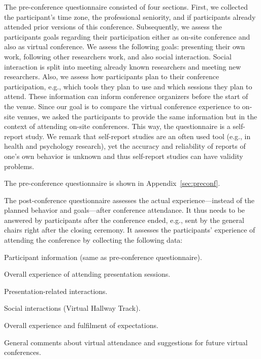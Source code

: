 \documentclass[sigconf]{acmart}
\newcommand{\afblock}[1]{\noindent{\textbf{#1 }}}
\begin{document}
The pre-conference questionnaire consisted of four sections.
First, we collected the participant's time zone, the professional seniority, and if participants already attended prior versions of this conference.
Subsequently, we assess the participants goals regarding their participation either as on-site conference and also as  virtual conference.
We assess the following goals: presenting their own work, following other researchers work, and also social interaction.
Social interaction is split into meeting already known researchers and meeting new researchers.
Also, we assess how participants plan to their conference participation, e.g., which tools they plan to use and which sessions they plan to attend.
These information can inform conference organizers before the start of the venue.
Since our goal is to compare the virtual conference experience to on-site venues, we asked the participants to provide the same information but in the context of attending on-site conferences.
This way, the questionnaire is a self-report study.
We remark that self-report studies are an often used tool (e.g., in health and psychology research), yet the accuracy and reliability of reports of one's own behavior is unknown and thus self-report studies can have validity problems.

The pre-conference questionnaire is shown in Appendix~\ref{sec:preconf}.

\afblock{Post-Conference Questionnaire.}
The post-conference questionnaire assesses the actual experience---instead of the planned behavior and goals---after conference attendance.
It thus needs to be answered by participants after the conference ended, e.g., sent by the general chairs right after the closing ceremony.
It assesses the participants' experience of attending the conference by collecting the following data:
\begin{inparaenum}[\it i)]
    \item Participant information (same as pre-conference questionnaire).
    \item Overall experience of attending presentation sessions.
    \item Presentation-related interactions.
    \item Social interactions (Virtual Hallway Track).
    \item Overall experience and fulfilment of expectations.
    \item General comments about virtual attendance and suggestions for future virtual conferences.
\end{inparaenum}
\end{document}
